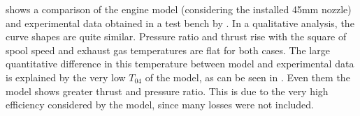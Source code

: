  shows a comparison of the engine model (considering the installed 45mm nozzle) and experimental data obtained in a test bench by \textcite{bolsoni_test}. In a qualitative analysis, the curve shapes are quite similar. Pressure ratio and thrust rise with the square of spool speed and exhaust gas temperatures are flat for both cases. The large quantitative difference in this temperature between model and experimental data is explained by the very low $T_{04}$ of the model, as can be seen in . Even them the model shows greater thrust and pressure ratio. This is due to the very high efficiency considered by the model, since many losses were not included.

